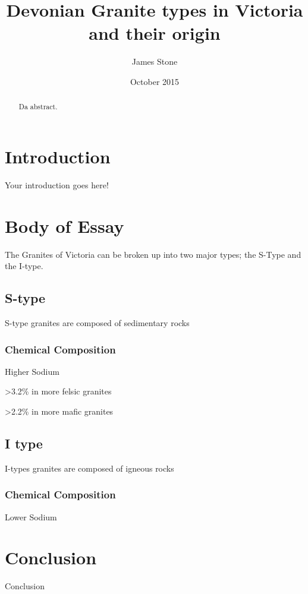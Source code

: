 \documentclass[a4paper]{article}
\title{Devonian Granite types in Victoria and their origin}
\author{James Stone}
\date{October 2015}
\begin{document}
\maketitle
\newpage

\begin{abstract}
Da abstract.
\end{abstract}

\section{Introduction}

Your introduction goes here!  

\section{Body of Essay}
The Granites of Victoria can be broken up into two major types; the S-Type and the I-type. \cite{BWChappell}
\label{sec:Body of Essay}

\subsection{S-type}
S-type granites are composed of sedimentary rocks

\subsubsection{Chemical Composition}
Higher Sodium

 \textgreater 3.2\% in more felsic granites

 \textgreater 2.2\% in more mafic granites


\subsection{I type}
I-types granites are composed of igneous rocks

\subsubsection{Chemical Composition}
Lower Sodium










\section{Conclusion}

Conclusion


\newpage


\end{document}
